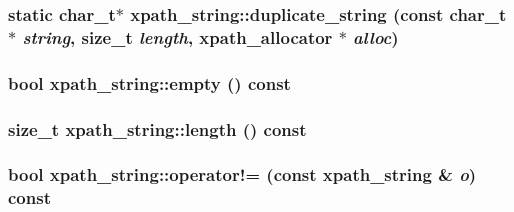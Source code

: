 \label{classxpath__string_a8e1458ed23ff94c0c27f8eb96fb26b11}
\hypertarget{classxpath__string_a57c53a0b67fecb1845c31215d8ee206b}{
\subsubsection[{duplicate\_\-string}]{\setlength{\rightskip}{0pt plus 5cm}static char\_\-t$\ast$ xpath\_\-string::duplicate\_\-string (const char\_\-t $\ast$ {\em string}, \/  size\_\-t {\em length}, \/  {\bf xpath\_\-allocator} $\ast$ {\em alloc})}}
\label{classxpath__string_a57c53a0b67fecb1845c31215d8ee206b}
\hypertarget{classxpath__string_a2a4f1988a700e20405c0f2c23d4e08a9}{
\subsubsection[{empty}]{\setlength{\rightskip}{0pt plus 5cm}bool xpath\_\-string::empty () const}}
\label{classxpath__string_a2a4f1988a700e20405c0f2c23d4e08a9}
\hypertarget{classxpath__string_a1238d6fdad0766a21965cfeb668f5a5b}{
\subsubsection[{length}]{\setlength{\rightskip}{0pt plus 5cm}size\_\-t xpath\_\-string::length () const}}
\label{classxpath__string_a1238d6fdad0766a21965cfeb668f5a5b}
\hypertarget{classxpath__string_afca32de44459a6805b90c517d5d5ab75}{
\subsubsection[{operator!=}]{\setlength{\rightskip}{0pt plus 5cm}bool xpath\_\-string::operator!= (const {\bf xpath\_\-string} \& {\em o}) const}}
